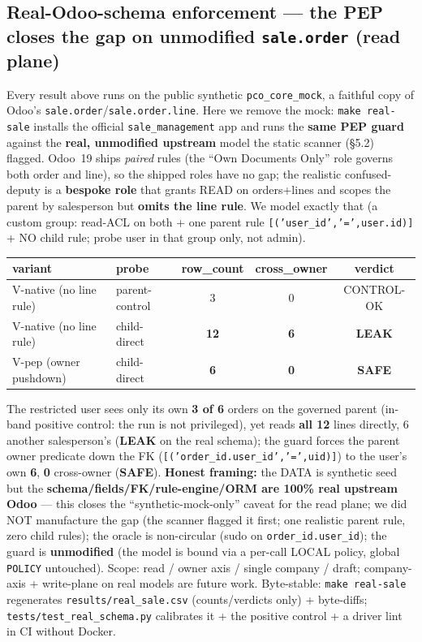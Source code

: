 \documentclass[11pt,a4paper]{article}
\newcommand{\code}[1]{\texttt{#1}}
\begin{document}
\subsection{Real-Odoo-schema enforcement --- the PEP closes the gap on unmodified \code{sale.order} (read plane)}
Every result above runs on the public synthetic \code{pco\_core\_mock}, a faithful copy of Odoo's
\code{sale.order}/\code{sale.order.line}. Here we remove the mock: \code{make real-sale} installs the official
\code{sale\_management} app and runs the \textbf{same PEP guard} against the \textbf{real, unmodified upstream}
model the static scanner (\S5.2) flagged. Odoo~19 ships \emph{paired} rules (the ``Own Documents Only'' role
governs both order and line), so the shipped roles have no gap; the realistic confused-deputy is a \textbf{bespoke
role} that grants READ on orders+lines and scopes the parent by salesperson but \textbf{omits the line rule}. We
model exactly that (a custom group: read-ACL on both + one parent rule \code{[('user\_id','=',user.id)]} + NO child
rule; probe user in that group only, not admin).

\begin{center}\small
\begin{tabular}{@{}llccc@{}}
\toprule
variant & probe & row\_count & cross\_owner & verdict \\
\midrule
V-native (no line rule) & parent-control & 3  & 0 & CONTROL-OK \\
V-native (no line rule) & child-direct   & \textbf{12} & \textbf{6} & \textbf{LEAK} \\
V-pep (owner pushdown)  & child-direct   & \textbf{6}  & \textbf{0} & \textbf{SAFE} \\
\bottomrule
\end{tabular}
\end{center}

The restricted user sees only its own \textbf{3 of 6} orders on the governed parent (in-band positive control:
the run is not privileged), yet reads \textbf{all 12} lines directly, 6 another salesperson's (\textbf{LEAK} on the
real schema); the guard forces the parent owner predicate down the FK (\code{[('order\_id.user\_id','=',uid)]}) to
the user's own \textbf{6}, \textbf{0} cross-owner (\textbf{SAFE}). \textbf{Honest framing:} the DATA is synthetic
seed but the \textbf{schema/fields/FK/rule-engine/ORM are 100\% real upstream Odoo} --- this closes the
``synthetic-mock-only'' caveat for the read plane; we did NOT manufacture the gap (the scanner flagged it first;
one realistic parent rule, zero child rules); the oracle is non-circular (sudo on \code{order\_id.user\_id}); the
guard is \textbf{unmodified} (the model is bound via a per-call LOCAL policy, global \code{POLICY} untouched).
Scope: read / owner axis / single company / draft; company-axis + write-plane on real models are future work.
Byte-stable: \code{make real-sale} regenerates \code{results/real\_sale.csv} (counts/verdicts only) + byte-diffs;
\code{tests/test\_real\_schema.py} calibrates it + the positive control + a driver lint in CI without Docker.
\end{document}
